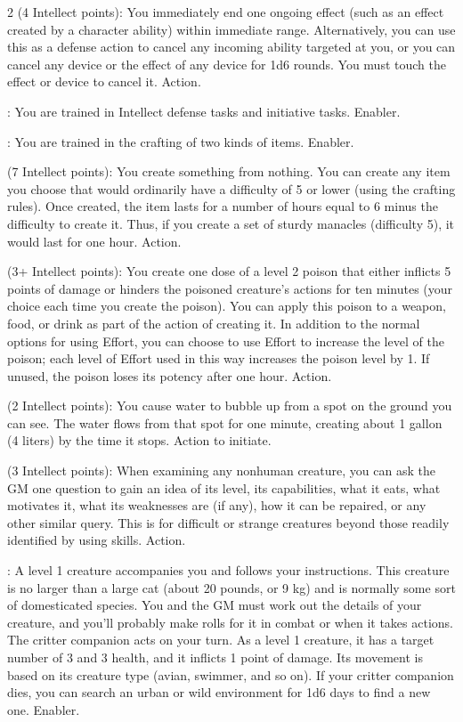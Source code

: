 \begin{multicols}{2}
 (4 Intellect points): You immediately end one ongoing effect (such as an effect created by a character ability) within immediate range. Alternatively, you can use this as a defense action to cancel any incoming ability targeted at you, or you can cancel any device or the effect of any device for 1d6 rounds. You must touch the effect or device to cancel it. Action. 

: You are trained in Intellect defense tasks and initiative tasks. Enabler. 

: You are trained in the crafting of two kinds of items. Enabler. 

 (7 Intellect points): You create something from nothing. You can create any item you choose that would ordinarily have a difficulty of 5 or lower (using the crafting rules). Once created, the item lasts for a number of hours equal to 6 minus the difficulty to create it. Thus, if you create a set of sturdy manacles (difficulty 5), it would last for one hour. Action. 

 (3+ Intellect points): You create one dose of a level 2 poison that either inflicts 5 points of damage or hinders the poisoned creature’s actions for ten minutes (your choice each time you create the poison). You can apply this poison to a weapon, food, or drink as part of the action of creating it. In addition to the normal options for using Effort, you can choose to use Effort to increase the level of the poison; each level of Effort used in this way increases the poison level by 1. If unused, the poison loses its potency after one hour. Action. 

 (2 Intellect points): You cause water to bubble up from a spot on the ground you can see. The water flows from that spot for one minute, creating about 1 gallon (4 liters) by the time it stops. Action to initiate.

 (3 Intellect points): When examining any nonhuman creature, you can ask the GM one question to gain an idea of its level, its capabilities, what it eats, what motivates it, what its weaknesses are (if any), how it can be repaired, or any other similar query. This is for difficult or strange creatures beyond those readily identified by using skills. Action. 

: A level 1 creature accompanies you and follows your instructions. This creature is no larger than a large cat (about 20 pounds, or 9 kg) and is normally some sort of domesticated species. You and the GM must work out the details of your creature, and you’ll probably make rolls for it in combat or when it takes actions. The critter companion acts on your turn. As a level 1 creature, it has a target number of 3 and 3 health, and it inflicts 1 point of damage. Its movement is based on its creature type (avian, swimmer, and so on). If your critter companion dies, you can search an urban or wild environment for 1d6 days to find a new one. Enabler.


\end{multicols}
